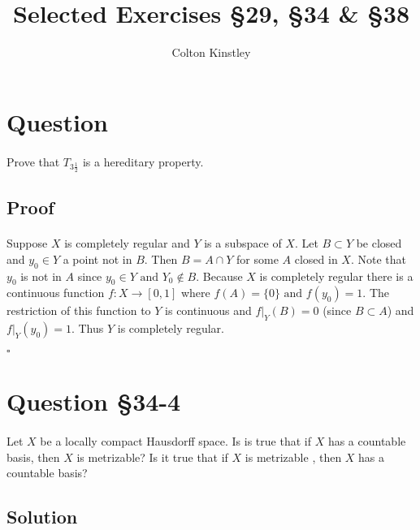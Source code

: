 \documentclass[11pt, oneside]{article}   	%
\title{Selected Exercises \S29, \S34 \& \S38}
\author{Colton Kinstley}
\newcommand{\tand}{\text{ and }}
\newcommand{\qed}{\begin{center}
$\square$
\end{center}}
\newcommand{\set}[1]{\{ #1 \}}
\begin{document}
\maketitle

\section*{Question}
\paragraph{}

Prove that $T_{3\frac{1}{2}}$ is a hereditary property.

\subsection*{Proof}
\paragraph{}

Suppose $X$ is completely regular and $Y$ is a subspace of $X$. Let $B \subset Y$ be closed and $y_0 \in Y$ a point not in $B$. Then $B = A \cap Y$  for some $A$ closed in $X$. Note that $y_0$ is not in $A$ since $y_0 \in Y \tand Y_0 \not \in B$. Because $X$ is completely regular there is a continuous function $f:X \to [0,1]$ where $f(A) = \set{0} \tand f(y_0) = 1$. The restriction of this function to $Y$ is continuous and $f|_Y(B) = 0$ (since $B \subset A$) and $f|_Y(y_0) = 1$. Thus $Y$ is completely regular. \qed

\section*{Question \S34-4}
\paragraph{}

Let $X$ be a locally compact Hausdorff space. Is is true that if $X$ has a countable basis, then $X$ is metrizable? Is it true that if $X$ is metrizable , then $X$ has a countable basis?

\subsection*{Solution}
\paragraph{}
\end{document}
